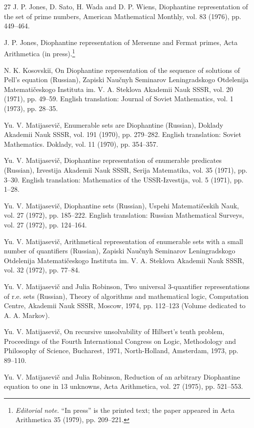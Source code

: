 \documentclass[11pt,a4paper]{article}
\newcommand{\ednote}[1]{\footnote{\textit{Editorial note.} #1}}
\begin{document}
\begin{thebibliography}{27}
 J. P. Jones, D. Sato, H. Wada and D. P. Wiens, Diophantine representation of the set of prime numbers, American Mathematical Monthly, vol. 83 (1976), pp. 449--464.

 J. P. Jones, Diophantine representation of Mersenne and Fermat primes, Acta Arithmetica (in press).\ednote{``In press'' is the printed text; the paper appeared in Acta Arithmetica 35 (1979), pp. 209--221.}

 N. K. Kosovskiĭ, On Diophantine representation of the sequence of solutions of Pell's equation (Russian), Zapiski Naučnyh Seminarov Leningradskogo Otdelenija Matematičeskogo Instituta im. V. A. Steklova Akademii Nauk SSSR, vol. 20 (1971), pp. 49--59. English translation: Journal of Soviet Mathematics, vol. 1 (1973), pp. 28--35.

 Yu. V. Matijasevič, Enumerable sets are Diophantine (Russian), Doklady Akademii Nauk SSSR, vol. 191 (1970), pp. 279--282. English translation: Soviet Mathematics. Doklady, vol. 11 (1970), pp. 354--357.

 Yu. V. Matijasevič, Diophantine representation of enumerable predicates (Russian), Izvestija Akademii Nauk SSSR, Serija Matematika, vol. 35 (1971), pp. 3--30. English translation: Mathematics of the USSR-Izvestija, vol. 5 (1971), pp. 1--28.

 Yu. V. Matijasevič, Diophantine sets (Russian), Uspehi Matematičeskih Nauk, vol. 27 (1972), pp. 185--222. English translation: Russian Mathematical Surveys, vol. 27 (1972), pp. 124--164.

 Yu. V. Matijasevič, Arithmetical representation of enumerable sets with a small number of quantifiers (Russian), Zapiski Naučnyh Seminarov Leningradskogo Otdelenija Matematičeskogo Instituta im. V. A. Steklova Akademii Nauk SSSR, vol. 32 (1972), pp. 77--84.

 Yu. V. Matijasevič and Julia Robinson, Two universal 3-quantifier representations of r.e. sets (Russian), Theory of algorithms and mathematical logic, Computation Centre, Akademii Nauk SSSR, Moscow, 1974, pp. 112--123 (Volume dedicated to A. A. Markov).

 Yu. V. Matijasevič, On recursive unsolvability of Hilbert's tenth problem, Proceedings of the Fourth International Congress on Logic, Methodology and Philosophy of Science, Bucharest, 1971, North-Holland, Amsterdam, 1973, pp. 89--110.

 Yu. V. Matijasevič and Julia Robinson, Reduction of an arbitrary Diophantine equation to one in 13 unknowns, Acta Arithmetica, vol. 27 (1975), pp. 521--553.


\end{thebibliography}
\end{document}
